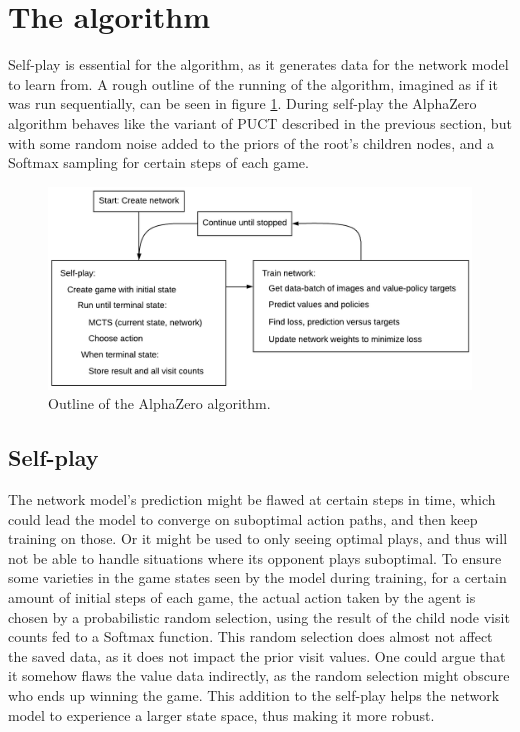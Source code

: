 \section{The algorithm}
Self-play is essential for the algorithm, as it generates data for the network model to learn from. A rough outline of the running of the algorithm, imagined as if it was run sequentially, can be seen in figure \ref{fig-az-algorithm}. During self-play the AlphaZero algorithm behaves like the variant of PUCT described in the previous section, but with some random noise added to the priors of the root's children nodes, and a Softmax sampling for certain steps of each game.

\begin{figure}[ht]
	\centering
	\includegraphics[width=1\textwidth]{figures/az-algorithm}
	\caption{Outline of the AlphaZero algorithm.}
	\label{fig-az-algorithm}
\end{figure}

\subsection{Self-play}
The network model's prediction might be flawed at certain steps in time, which could lead the model to converge on suboptimal action paths, and then keep training on those. Or it might be used to only seeing optimal plays, and thus will not be able to handle situations where its opponent plays suboptimal. To ensure some varieties in the game states seen by the model during training, for a certain amount of initial steps of each game, the actual action taken by the agent is chosen by a probabilistic random selection, using the result of the child node visit counts fed to a Softmax function. This random selection does almost not affect the saved data, as it does not impact the prior visit values. One could argue that it somehow flaws the value data indirectly, as the random selection might obscure who ends up winning the game. This addition to the self-play helps the network model to experience a larger state space, thus making it more robust.

